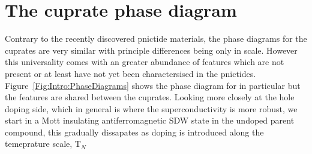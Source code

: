 
\section{The cuprate phase diagram}

Contrary to the recently discovered pnictide materials, the phase diagrams for the cuprates are very similar with principle differences being only in scale. However this universality comes with an greater abundance of features which are not present or at least have not yet been charactersised in the pnictides. Figure~\ref{Fig:Intro:PhaseDiagrams} shows the phase diagram for  in particular but the features are shared between the cuprates. Looking more closely at the hole doping side, which in general is where the superconductivity is more robust, we start in a Mott insulating antiferromagnetic \ac{SDW} state in the undoped parent compound, this gradually dissapates as doping is introduced along the temeprature scale, T$_N$
